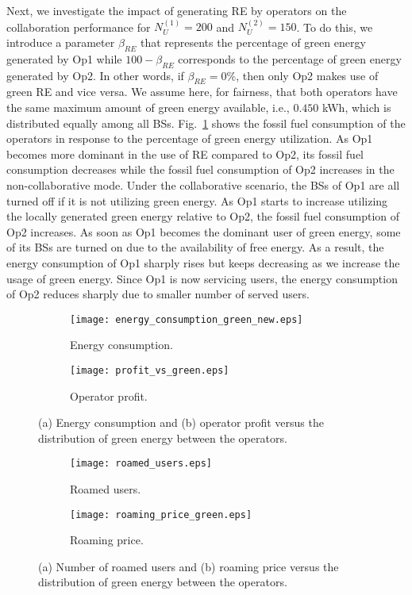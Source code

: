 \documentclass[10pt, letter, twocolumn]{IEEEtran}
\begin{document}
Next, we investigate the impact of generating RE by operators on the collaboration performance for $N_{U}^{(1)}=200$ and $N_{U}^{(2)}=150$. To do this, we introduce a parameter $\beta_{RE}$ that represents the percentage of green energy generated by Op1 while $100-\beta_{RE}$ corresponds to the percentage of green energy generated by Op2. In other words, if $\beta_{RE}=0\%$, then only Op2 makes use of green RE and vice versa. We assume here, for fairness, that both operators have the same maximum amount of green energy available, i.e., $0.450$ kWh, which is distributed equally among all BSs. Fig.~\ref{energy_vs_green_fig} shows the fossil fuel consumption of the operators in response to the percentage of green energy utilization. As Op1 becomes more dominant in the use of RE compared to Op2, its fossil fuel consumption decreases while the fossil fuel consumption of Op2 increases in the non-collaborative mode. Under the collaborative scenario, the BSs of Op1 are all turned off if it is not utilizing green energy. As Op1 starts to increase utilizing the locally generated green energy relative to Op2, the fossil fuel consumption of Op2 increases. As soon as Op1 becomes the dominant user of green energy, some of its BSs are turned on due to the availability of free energy. As a result, the energy consumption of Op1 sharply rises but keeps decreasing as we increase the usage of green energy. Since Op1 is now servicing users, the energy consumption of Op2 reduces sharply due to smaller number of served users.
\begin{figure}[t]
\begin{subfigure}[t]{.45\textwidth}
  \centering
    \texttt{[image: energy\_consumption\_green\_new.eps]}
    \caption{Energy consumption.}
    \label{energy_vs_green_fig}
  \end{subfigure}\hfill
  \begin{subfigure}[t]{.45\textwidth}
  \centering
    \texttt{[image: profit\_vs\_green.eps]}
    \caption{Operator profit.}
    \label{profit_vs_green_fig}
  \end{subfigure}
\caption{(a) Energy consumption and (b) operator profit versus the distribution of green energy between the operators.}
\label{energy_and_profit_fig}
\end{figure}
\begin{figure}[t]
\begin{subfigure}[t]{.45\textwidth}
  \centering
    \texttt{[image: roamed\_users.eps]}
    \caption{Roamed users.}
    \label{roamed_users_fig}
  \end{subfigure}\hfill
  \begin{subfigure}[t]{.45\textwidth}
  \centering
    \texttt{[image: roaming\_price\_green.eps]}
    \caption{Roaming price.}\vspace{-0.2cm}
    \label{roaming_price_vs_green_fig}
  \end{subfigure}
\caption{(a) Number of roamed users and (b) roaming price versus the distribution of green energy between the operators.}
\label{roamed_user_and_price_fig}
\end{figure}
\end{document}
